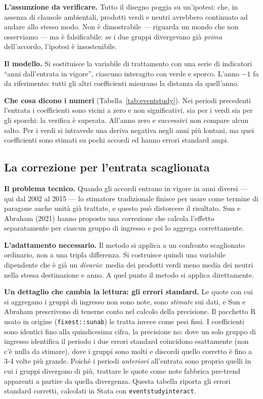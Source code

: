 \documentclass[11pt,a4paper]{article}
\begin{document}
\textbf{L'assunzione da verificare.} Tutto il disegno poggia su un'ipotesi: che, in assenza
di clausole ambientali, prodotti verdi e neutri avrebbero continuato ad andare allo stesso
modo. Non \`e dimostrabile --- riguarda un mondo che non osserviamo --- ma \`e falsificabile:
se i due gruppi divergevano gi\`a \emph{prima} dell'accordo, l'ipotesi \`e insostenibile.

\textbf{Il modello.} Si sostituisce la variabile di trattamento con una serie di indicatori
``anni dall'entrata in vigore'', ciascuno interagito con verde e sporco. L'anno $-1$ fa da
riferimento: tutti gli altri coefficienti misurano la distanza da quell'anno.

\textbf{Che cosa dicono i numeri} (Tabella~\ref{tab:eventstudy}). Nei periodi precedenti
l'entrata i coefficienti sono vicini a zero e non significativi, sia per i verdi sia per
gli sporchi: la verifica \`e superata. All'anno zero e successivi non compare alcun salto.
Per i verdi si intravede una deriva negativa negli anni pi\`u lontani, ma quei coefficienti
sono stimati su pochi accordi ed hanno errori standard ampi.



\clearpage
\subsection{La correzione per l'entrata scaglionata}

\textbf{Il problema tecnico.} Quando gli accordi entrano in vigore in anni diversi --- qui
dal 2002 al 2015 --- lo stimatore tradizionale finisce per usare come termine di paragone
anche unit\`a gi\`a trattate, e questo pu\`o distorcere il risultato. Sun e Abraham (2021)
hanno proposto una correzione che calcola l'effetto separatamente per ciascun gruppo di
ingresso e poi lo aggrega correttamente.

\textbf{L'adattamento necessario.} Il metodo si applica a un confronto scaglionato
ordinario, non a una tripla differenza. Si costruisce quindi una variabile dipendente che
\`e gi\`a un \emph{divario}: media dei prodotti verdi meno media dei neutri nella stessa
destinazione e anno. A quel punto il metodo si applica direttamente.

\textbf{Un dettaglio che cambia la lettura: gli errori standard.} Le quote con cui si
aggregano i gruppi di ingresso non sono note, sono \emph{stimate} sui dati, e Sun e Abraham
prescrivono di tenerne conto nel calcolo della precisione. Il pacchetto R usato in origine
(\texttt{fixest::sunab}) le tratta invece come pesi fissi. I coefficienti sono identici fino
alla quindicesima cifra, la precisione no: dove un solo gruppo di ingresso identifica il
periodo i due errori standard coincidono esattamente (non c'\`e nulla da stimare), dove i
gruppi sono molti e discordi quello corretto \`e fino a 3-4 volte pi\`u grande. Poich\'e i
periodi \emph{anteriori} all'entrata sono proprio quelli in cui i gruppi divergono di pi\`u,
trattare le quote come note fabbrica pre-trend apparenti a partire da quella divergenza.
Questa tabella riporta gli errori standard corretti, calcolati in Stata con
\texttt{eventstudyinteract}.
\end{document}
